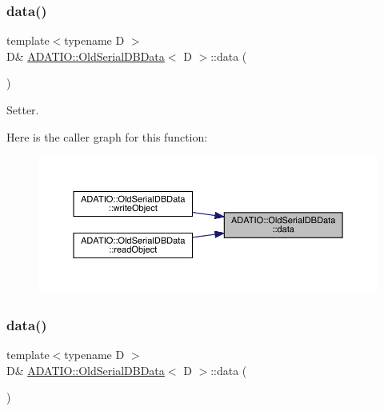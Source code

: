 \subsubsection{\texorpdfstring{data()}{data()}\hspace{0.1cm}{\footnotesize\ttfamily [1/4]}}
{\footnotesize\ttfamily template$<$typename D $>$ \\
D\& \mbox{\hyperlink{classADATIO_1_1OldSerialDBData}{A\+D\+A\+T\+I\+O\+::\+Old\+Serial\+D\+B\+Data}}$<$ D $>$\+::data (\begin{DoxyParamCaption}{ }\end{DoxyParamCaption})\hspace{0.3cm}{\ttfamily [inline]}}



Setter. 

Here is the caller graph for this function\+:\nopagebreak
\begin{figure}[H]
\begin{center}
\leavevmode
\includegraphics[width=350pt]{da/dbc/classADATIO_1_1OldSerialDBData_ad917fd5898616290b7c0d30cb878850f_icgraph}
\end{center}
\end{figure}
\mbox{\label{classADATIO_1_1OldSerialDBData_ad917fd5898616290b7c0d30cb878850f}} 
\subsubsection{\texorpdfstring{data()}{data()}\hspace{0.1cm}{\footnotesize\ttfamily [2/4]}}
{\footnotesize\ttfamily template$<$typename D $>$ \\
D\& \mbox{\hyperlink{classADATIO_1_1OldSerialDBData}{A\+D\+A\+T\+I\+O\+::\+Old\+Serial\+D\+B\+Data}}$<$ D $>$\+::data (\begin{DoxyParamCaption}{ }\end{DoxyParamCaption})\hspace{0.3cm}{\ttfamily [inline]}}



